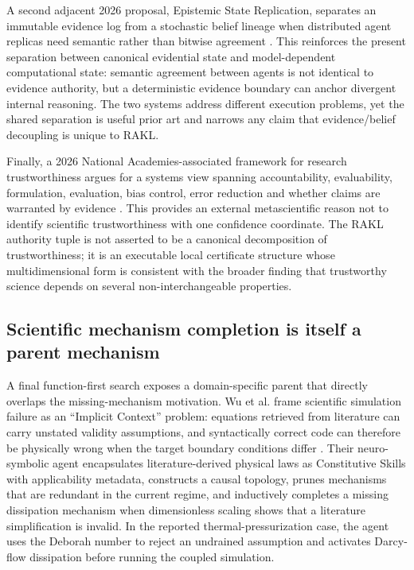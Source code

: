 \documentclass[11pt]{article}
\begin{document}
A second adjacent 2026 proposal, Epistemic State Replication, separates an immutable evidence log from a stochastic belief lineage when distributed agent replicas need semantic rather than bitwise agreement \cite{heyu2026esr}. This reinforces the present separation between canonical evidential state and model-dependent computational state: semantic agreement between agents is not identical to evidence authority, but a deterministic evidence boundary can anchor divergent internal reasoning. The two systems address different execution problems, yet the shared separation is useful prior art and narrows any claim that evidence/belief decoupling is unique to RAKL.

Finally, a 2026 National Academies-associated framework for research trustworthiness argues for a systems view spanning accountability, evaluability, formulation, evaluation, bias control, error reduction and whether claims are warranted by evidence \cite{nosek2026trust}. This provides an external metascientific reason not to identify scientific trustworthiness with one confidence coordinate. The RAKL authority tuple is not asserted to be a canonical decomposition of trustworthiness; it is an executable local certificate structure whose multidimensional form is consistent with the broader finding that trustworthy science depends on several non-interchangeable properties.

\subsection{Scientific mechanism completion is itself a parent mechanism}

A final function-first search exposes a domain-specific parent that directly overlaps the missing-mechanism motivation. Wu et al. frame scientific simulation failure as an ``Implicit Context'' problem: equations retrieved from literature can carry unstated validity assumptions, and syntactically correct code can therefore be physically wrong when the target boundary conditions differ \cite{wu2026epistemicclosure}. Their neuro-symbolic agent encapsulates literature-derived physical laws as Constitutive Skills with applicability metadata, constructs a causal topology, prunes mechanisms that are redundant in the current regime, and inductively completes a missing dissipation mechanism when dimensionless scaling shows that a literature simplification is invalid. In the reported thermal-pressurization case, the agent uses the Deborah number to reject an undrained assumption and activates Darcy-flow dissipation before running the coupled simulation.
\end{document}
